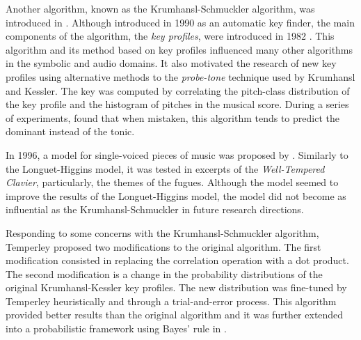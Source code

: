 Another algorithm, known as the Krumhansl-Schmuckler
algorithm, was introduced in
\textcite{krumhansl1990cognitive}. Although introduced in
1990 as an automatic key finder, the main components of the
algorithm, the \emph{key profiles}, were introduced in 1982
\parencite{krumhansl1982tracing}. This algorithm and its
method based on key profiles influenced many other
algorithms in the symbolic and audio domains. It also
motivated the research of new key profiles using
alternative methods to the \emph{probe-tone} technique used
by Krumhansl and Kessler. The key was computed by
correlating the pitch-class distribution of the key profile
and the histogram of pitches in the musical score. During a
series of experiments, \textcite{sapp2011computational}
found that when mistaken, this algorithm tends to predict
the dominant instead of the tonic.



In 1996, a model for single-voiced pieces of music was
proposed by \textcite{vos1996parallelprocessing}. Similarly
to the Longuet-Higgins model, it was tested in excerpts of
the \emph{Well-Tempered Clavier}, particularly, the themes
of the fugues. Although the model seemed to improve the
results of the Longuet-Higgins model, the model did not
become as influential as the Krumhansl-Schmuckler in future
research directions.



Responding to some concerns with the Krumhansl-Schmuckler
algorithm, Temperley \textcite{temperley1999whats} proposed
two modifications to the original algorithm. The first
modification consisted in replacing the correlation
operation with a dot product. The second modification is a
change in the probability distributions of the original
Krumhansl-Kessler key profiles. The new distribution was
fine-tuned by Temperley heuristically and through a
trial-and-error process. This algorithm provided better
results than the original algorithm and it was further
extended into a probabilistic framework using Bayes' rule in
\textcite{temperley2002bayesian}.



